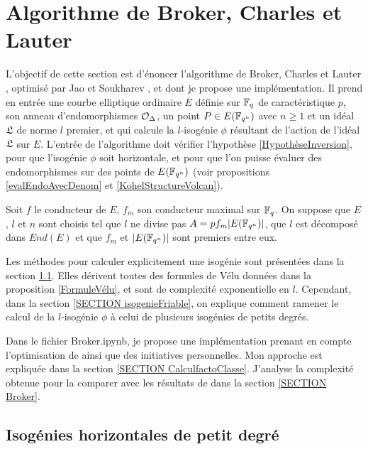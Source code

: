 \section{Algorithme de Broker, Charles et Lauter}\label{SECTION friableEtBroker}

L'objectif de cette section est d'énoncer l'algorithme de Broker, Charles et Lauter \cite{BrokerCharlesLauter}, optimisé par Jao et Soukharev \cite{JaoSoukharev}, et dont je propose une implémentation. Il prend en entrée une courbe elliptique ordinaire $E$ définie sur $\mathbb{F}_{q}$ de caractéristique $p$, son anneau d'endomorphismes $\mathcal{O}_{\Delta}$, un point $P\in E(\mathbb{F}_{q^{n}})$ avec $n\geq1$ et un idéal $\mathfrak{L}$ de norme $l$ premier, et qui calcule la $l$-isogénie $\phi$ résultant de l'action de l'idéal $\mathfrak{L}$ sur $E$. L'entrée de l'algorithme doit vérifier l'hypothèse \ref{HypothèseInversion}, pour que l'isogénie $\phi$ soit horizontale, et pour que l'on puisse évaluer des endomorphismes sur des points de $E(\mathbb{F}_{q^{n}})$ (voir propositions \ref{evalEndoAvecDenom} et \ref{KohelStructureVolcan}). 

\begin{Hyp}\label{HypothèseInversion}
	Soit $f$ le conducteur de $E$, $f_m$ son conducteur maximal sur $\mathbb{F}_{q}$. On suppose que $E$, $l$ et $n$ sont choisis tel que $l$ ne divise pas $A = pf_m|E(\mathbb{F}_{q^{n}})|$, que $l$ est décomposé dans $End(E)$ et que $f_{m}$ et $|E(\mathbb{F}_{q^{n}})|$ sont premiers entre eux.
\end{Hyp}

 Les méthodes pour calculer explicitement une isogénie sont présentées dans la section \ref{SECTION isogénieDegrésPetits}. Elles dérivent toutes des formules de Vélu données dans la proposition \ref{FormuleVélu}, et sont de complexité exponentielle en $l$. Cependant, dans la section \ref{SECTION isogenieFriable}, on explique comment ramener le calcul de la $l$-isogénie $\phi$ à celui de plusieurs isogénies de petits degrés. 
 
 Dans le fichier Broker.ipynb, je propose une implémentation prenant en compte l'optimisation de \cite{JaoSoukharev} ainsi que des initiatives personnelles. Mon approche est expliquée dans la section \ref{SECTION CalculfactoClasse}. J'analyse la complexité obtenue pour la comparer avec les résultats de \cite{JaoSoukharev} dans la section \ref{SECTION Broker}.   

\subsection{Isogénies horizontales de petit degré}
\label{SECTION isogénieDegrésPetits}

